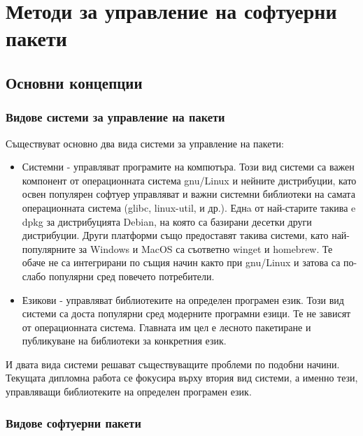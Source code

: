 \graphicspath{ {./chapter1/images/} }

\chapter{Методи за управление на софтуерни пакети}


\section{Основни концепции}

\subsection{Видове системи за управление на пакети}

Съществуват основно два вида системи за управление на пакети:

\begin{itemize}
    \item Системни - управляват програмите на компютъра. Този вид системи са
          важен компонент от операционната система \acrshort{gnu}/Linux и
          нейните дистрибуции, като освен популярен софтуер управляват и важни
          системни библиотеки на самата операционната система (glibc,
          linux-util, и др.). Еднa от най-старите такива e dpkg за дистрибуцията
          Debian, на която са базирани десетки други дистрибуции. Други
          платформи също предоставят такива системи, като най-популярните за
          Windows и MacOS са съответно winget и homebrew. Те обаче не са
          интегрирани по същия начин както при \acrshort{gnu}/Linux и затова са
          по-слабо популярни сред повечето потребители.
    \item Езикови - управляват библиотеките на определен програмен език. Този
          вид системи са доста популярни сред модерните програмни езици. Те не
          зависят от операционната система. Главната им цел е лесното пакетиране
          и публикуване на библиотеки за конкретния език.
\end{itemize}

И двата вида системи решават съществуващите проблеми по подобни начини. Текущата
дипломна работа се фокусира върху втория вид системи, а именно тези, управляващи
библиотеките на определен програмен език.


\subsection{Видове софтуерни пакети}

